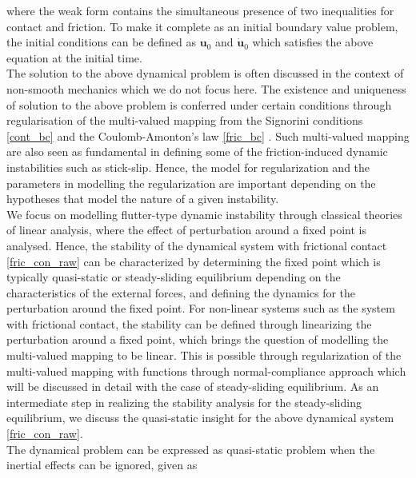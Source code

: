 where the weak form contains the simultaneous presence of two inequalities for contact and friction. To make it complete as an initial boundary value problem, the initial conditions can be defined as $\bm{u}_0$ and $\bm{\dot{u}}_0$ which satisfies the above equation at the initial time. \\

The solution to the above dynamical problem is often discussed in the context of non-smooth mechanics which we do not focus here. 
The existence and uniqueness of solution to the above problem  is conferred under certain conditions through regularisation of the multi-valued mapping from the Signorini conditions \eqref{cont_bc} and the Coulomb-Amonton's law \eqref{fric_bc} . Such multi-valued mapping are also seen as fundamental in defining some of the friction-induced dynamic instabilities such as stick-slip. Hence, the model for regularization and the parameters in modelling the regularization are important depending on the hypotheses that model the nature of a given instability.\\ 

We focus on modelling flutter-type dynamic instability through classical theories of linear analysis, where the effect of perturbation around a fixed point is analysed. Hence, the stability of the dynamical system with frictional contact \eqref{fric_con_raw} can be characterized by determining the fixed point which is typically quasi-static or steady-sliding equilibrium depending on the characteristics of the external forces, and defining the dynamics for the perturbation around the fixed point.
For non-linear systems such as the system with frictional contact, the stability can be defined through linearizing the perturbation around a fixed point, which brings the question of modelling the multi-valued mapping to be linear. 
This is possible through regularization of the multi-valued mapping with functions through normal-compliance approach which will be discussed in detail with the case of steady-sliding equilibrium.   
As an intermediate step in realizing the stability analysis for the steady-sliding equilibrium, we discuss the quasi-static insight for the above dynamical system \eqref{fric_con_raw}.\\


The dynamical problem can be expressed as quasi-static problem when the inertial effects can be ignored, given as 

